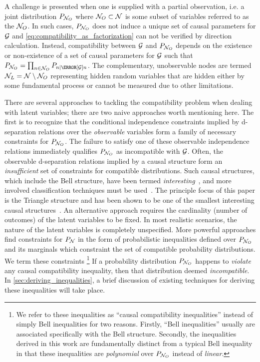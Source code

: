 \documentclass[aps, 10pt, english, twoside, pra, nofootinbib, tightenlines, longbibliography, superscriptaddress]{revtex4-1}
\begin{document}
    A challenge is presented when one is supplied with a partial observation, i.e. a joint distribution $\prob[\nodes_{O}]$ where $\mathcal{N}_{O} \subset \mathcal{N}$ is some subset of variables referred to as the  $\mathcal{N}_O$. In such cases, $\prob[\nodes_{O}]$ does not induce a unique set of causal parameters for $\mathcal{G}$ and \cref{eq:compatibility_as_factorization} can not be verified by direction calculation. Instead, compatibility between $\mathcal{G}$ and $\prob[\nodes_{O}]$ depends on the existence or non-existence of a set of causal parameters for $\mathcal{G}$ such that $\prob[\nodes_{O}] = \prod_{n \in \nodes_{O}} \prob[n \mid \Pa[\graph]{n}]$. The complementary, unobservable nodes are termed  $\mathcal{N}_L = \mathcal{N} \setminus \mathcal{N}_{O}$ representing hidden random variables that are hidden either by some fundamental process or cannot be measured due to other limitations.

    There are several approaches to tackling the compatibility problem when dealing with latent variables; there are two naive approaches worth mentioning here. The first is to recognize that the conditional independence constraints implied by d-separation relations over the \textit{observable} variables form a family of necessary constraints for $\prob[\nodes_{O}]$. The failure to satisfy one of these observable independence relations immediately qualifies $\prob[\nodes_{O}]$ as incompatible with $\mathcal{G}$. Often, the observable d-separation relations implied by a causal structure form an \textit{insufficient} set of constraints for compatible distributions. Such causal structures, which include the Bell structure, have been termed \textit{interesting}~\cite{Henson_2014}, and more involved classification techniques must be used~\cite{Inflation}. The principle focus of this paper is the Triangle structure and has been shown to be one of the smallest interesting causal structures~\cite{Henson_2014}. An alternative approach requires the cardinality (number of outcomes) of the latent variables to be fixed. In most realistic scenarios, the nature of the latent variables is completely unspecified. More powerful approaches find constraints for $\prob[\nodes]$ in the form of probabilistic inequalities defined over $\prob[\nodes_{O}]$ and its marginals which constraint the set of compatible probability distributions. We term these constraints \footnote{We refer to these inequalities as ``causal compatibility inequalities'' instead of simply Bell inequalities for two reasons. Firstly, ``Bell inequalities'' usually are associated specifically with the Bell structure. Secondly, the inequalities derived in this work are fundamentally distinct from a typical Bell inequality in that these inequalities are \textit{polynomial} over $\prob[\nodes_{O}]$ instead of \textit{linear}.} If a probability distribution $\prob[\nodes_{O}]$ happens to \textit{violate} any causal compatibility inequality, then that distribution deemed \textit{incompatible}. In \cref{sec:deriving_inequalities}, a brief discussion of existing techniques for deriving these inequalities will take place.
\end{document}
